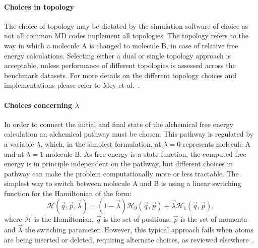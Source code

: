 \documentclass[9pt,bestpractices]{livecoms}
\begin{document}
\paragraph{Choices in topology}
The choice of topology may be dictated by the simulation software of choice as not all common MD codes implement all topologies. The topology refers to the way in which a molecule A is changed to molecule B, in case of relative free energy calculations. Selecting either a dual or single topology approach is acceptable, unless performance of different topologies is assessed across the benchmark datasets. For more details on the different topology choices and implementations please refer to Mey et al.~\cite{meyBestPracticesAlchemical2020}.


\paragraph{Choices concerning $\lambda$}
In order to connect the initial and final state of the alchemical free energy calculation an alchemical pathway must be chosen. This pathway is regulated by a variable $\lambda$, which, in the simplest formulation, at $\lambda=0$ represents molecule A and at $\lambda=1$ molecule B. As free energy is a state function, the computed free energy is in principle independent on the pathway, but different choices in pathway can make the problem computationally more or less tractable. The simplest way to switch between molecule A and B is using a linear switching function for the Hamiltonian of the form:
\begin{equation}
\label{eq:switching}
\mathcal{H}(\vec{q},\vec{p},\vec{\lambda}) = (1-\vec{\lambda}) \mathcal{H}_0(\vec{q},\vec{p}) + \vec{\lambda}\mathcal{H}_1(\vec{q},\vec{p}),
\end{equation}
where $\mathcal{H}$ is the Hamiltonian, $\vec{q}$ is the set of positions, $\vec{p}$ is the set of momenta and $\vec{\lambda}$ the switching parameter. However, this typical approach fails when atoms are being inserted or deleted, requiring alternate choices, as reviewed elsewhere~\cite{meyBestPracticesAlchemical2020}.
\end{document}
